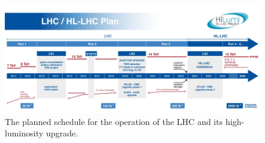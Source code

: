 \begin{figure}[h!]
  \centering
  \includegraphics[width=\textwidth]{Figures/HGCAL/LHCschedule.jpg}
  \caption[Planned LHC and HL-LHC schedule]
  {The planned schedule for the operation of the LHC and its high-luminosity upgrade.}
  \label{fig:hgcal_LHCschedule}
\end{figure}

